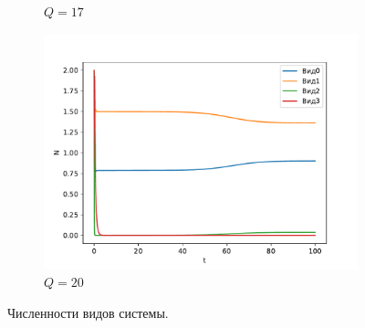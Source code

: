 \begin{figure}[H]
\begin{subfigure}[t]{.3\linewidth}
        \caption{\(Q = 17\)}
    \end{subfigure}
    \begin{subfigure}[t]{.3\linewidth}
        \centering
        \includegraphics[width=\textwidth]{pictures/exp_flow/exp2_Q20.pdf}
        \caption{\(Q = 20\)}
    \end{subfigure}
    \caption{Численности видов системы.}  \label{fig:flow_exp2_q1}
\end{figure}

